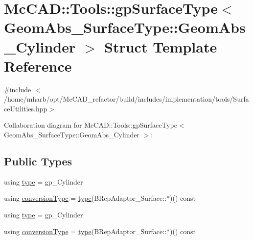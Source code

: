 \hypertarget{structMcCAD_1_1Tools_1_1gpSurfaceType_3_01GeomAbs__SurfaceType_1_1GeomAbs__Cylinder_01_4}{}\section{Mc\+C\+AD\+:\+:Tools\+:\+:gp\+Surface\+Type$<$ Geom\+Abs\+\_\+\+Surface\+Type\+:\+:Geom\+Abs\+\_\+\+Cylinder $>$ Struct Template Reference}
\label{structMcCAD_1_1Tools_1_1gpSurfaceType_3_01GeomAbs__SurfaceType_1_1GeomAbs__Cylinder_01_4}


{\ttfamily \#include $<$/home/mharb/opt/\+Mc\+C\+A\+D\+\_\+refactor/build/includes/implementation/tools/\+Surface\+Utilities.\+hpp$>$}



Collaboration diagram for Mc\+C\+AD\+:\+:Tools\+:\+:gp\+Surface\+Type$<$ Geom\+Abs\+\_\+\+Surface\+Type\+:\+:Geom\+Abs\+\_\+\+Cylinder $>$\+:
\subsection*{Public Types}
\begin{DoxyCompactItemize}
\item 
using \hyperlink{structMcCAD_1_1Tools_1_1gpSurfaceType_3_01GeomAbs__SurfaceType_1_1GeomAbs__Cylinder_01_4_aba440b967c5c31905e30cf460c016e56}{type} = gp\+\_\+\+Cylinder
\item 
using \hyperlink{structMcCAD_1_1Tools_1_1gpSurfaceType_3_01GeomAbs__SurfaceType_1_1GeomAbs__Cylinder_01_4_aeb0860ae6aba6767a3c8eecc5089087c}{conversion\+Type} = \hyperlink{structMcCAD_1_1Tools_1_1gpSurfaceType_3_01GeomAbs__SurfaceType_1_1GeomAbs__Cylinder_01_4_aba440b967c5c31905e30cf460c016e56}{type}(B\+Rep\+Adaptor\+\_\+\+Surface\+::$\ast$)() const
\item 
using \hyperlink{structMcCAD_1_1Tools_1_1gpSurfaceType_3_01GeomAbs__SurfaceType_1_1GeomAbs__Cylinder_01_4_aba440b967c5c31905e30cf460c016e56}{type} = gp\+\_\+\+Cylinder
\item 
using \hyperlink{structMcCAD_1_1Tools_1_1gpSurfaceType_3_01GeomAbs__SurfaceType_1_1GeomAbs__Cylinder_01_4_aeb0860ae6aba6767a3c8eecc5089087c}{conversion\+Type} = \hyperlink{structMcCAD_1_1Tools_1_1gpSurfaceType_3_01GeomAbs__SurfaceType_1_1GeomAbs__Cylinder_01_4_aba440b967c5c31905e30cf460c016e56}{type}(B\+Rep\+Adaptor\+\_\+\+Surface\+::$\ast$)() const
\end{DoxyCompactItemize}
